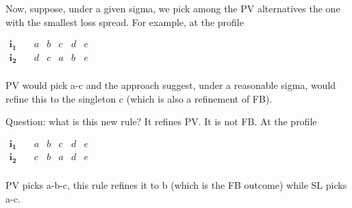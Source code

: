 \documentclass[version=3.21, pagesize, twoside=off, bibliography=totoc, DIV=calc, fontsize=12pt, a4paper]{scrartcl}
\begin{document}
\begin{remark}[Consideration]
Now, suppose, under a given sigma, we pick among the PV alternatives the one with the smallest loss spread. For example, at the profile 
\begin{center}
	$
	\begin{array}{cccccc}
		\mathbf{i_1} \quad &a&b&c&d&e\\
		\mathbf{i_2} \quad &d&c&a&b&e\\
	\end{array}
	$
\end{center}

PV would pick a-c and the approach suggest, under a reasonable sigma, would refine this to the singleton c (which is also a refinement of FB).

Question: what is this new rule? It refines PV. It is not FB. At the profile

\begin{center}
	$
	\begin{array}{cccccc}
		\mathbf{i_1} \quad &a&b&c&d&e\\
		\mathbf{i_2} \quad &c&b&a&d&e\\
	\end{array}
	$
\end{center}

PV picks a-b-c, this rule refines it to b (which is the FB outcome) while SL picks a-c.
\end{remark}
\end{document}
